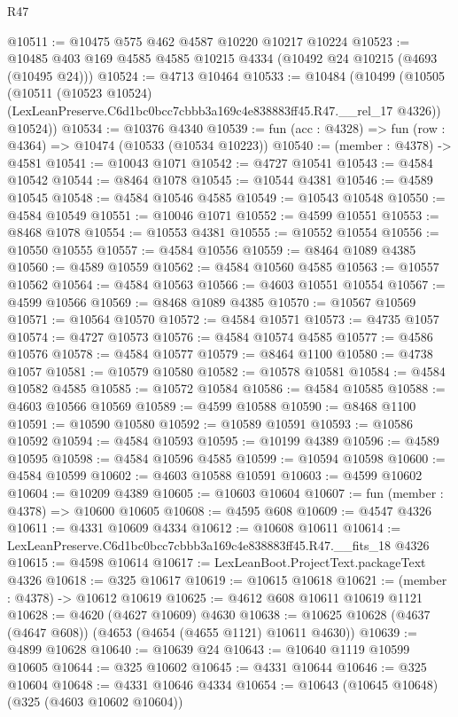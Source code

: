 \begin{lexlean}{R47}
\begin{coremodule}
@10511 := @10475 @575 @462 @4587 @10220 @10217 @10224
@10523 := @10485 @403 @169 @4585 @4585 @10215 @4334 (@10492 @24 @10215 (@4693 (@10495 @24)))
@10524 := @4713 @10464
@10533 := @10484
    (@10499
      (@10505
        (@10511
          (@10523 @10524)
          (LexLeanPreserve.C6d1bc0bcc7cbbb3a169c4e838883ff45.R47.__rel_17 @4326))
        @10524))
@10534 := @10376 @4340
@10539 := fun (acc : @4328) => fun (row : @4364) => @10474 (@10533 (@10534 @10223))
@10540 := (member : @4378) -> @4581
@10541 := @10043 @1071
@10542 := @4727 @10541
@10543 := @4584 @10542
@10544 := @8464 @1078
@10545 := @10544 @4381
@10546 := @4589 @10545
@10548 := @4584 @10546 @4585
@10549 := @10543 @10548
@10550 := @4584 @10549
@10551 := @10046 @1071
@10552 := @4599 @10551
@10553 := @8468 @1078
@10554 := @10553 @4381
@10555 := @10552 @10554
@10556 := @10550 @10555
@10557 := @4584 @10556
@10559 := @8464 @1089 @4385
@10560 := @4589 @10559
@10562 := @4584 @10560 @4585
@10563 := @10557 @10562
@10564 := @4584 @10563
@10566 := @4603 @10551 @10554
@10567 := @4599 @10566
@10569 := @8468 @1089 @4385
@10570 := @10567 @10569
@10571 := @10564 @10570
@10572 := @4584 @10571
@10573 := @4735 @1057
@10574 := @4727 @10573
@10576 := @4584 @10574 @4585
@10577 := @4586 @10576
@10578 := @4584 @10577
@10579 := @8464 @1100
@10580 := @4738 @1057
@10581 := @10579 @10580
@10582 := @10578 @10581
@10584 := @4584 @10582 @4585
@10585 := @10572 @10584
@10586 := @4584 @10585
@10588 := @4603 @10566 @10569
@10589 := @4599 @10588
@10590 := @8468 @1100
@10591 := @10590 @10580
@10592 := @10589 @10591
@10593 := @10586 @10592
@10594 := @4584 @10593
@10595 := @10199 @4389
@10596 := @4589 @10595
@10598 := @4584 @10596 @4585
@10599 := @10594 @10598
@10600 := @4584 @10599
@10602 := @4603 @10588 @10591
@10603 := @4599 @10602
@10604 := @10209 @4389
@10605 := @10603 @10604
@10607 := fun (member : @4378) => @10600 @10605
@10608 := @4595 @608
@10609 := @4547 @4326
@10611 := @4331 @10609 @4334
@10612 := @10608 @10611
@10614 := LexLeanPreserve.C6d1bc0bcc7cbbb3a169c4e838883ff45.R47.__fits_18 @4326
@10615 := @4598 @10614
@10617 := LexLeanBoot.ProjectText.packageText @4326
@10618 := @325 @10617
@10619 := @10615 @10618
@10621 := (member : @4378) -> @10612 @10619
@10625 := @4612 @608 @10611 @10619 @1121
@10628 := @4620 (@4627 @10609) @4630
@10638 := @10625 @10628 (@4637 (@4647 @608)) (@4653 (@4654 (@4655 @1121) @10611 @4630))
@10639 := @4899 @10628
@10640 := @10639 @24
@10643 := @10640 @1119 @10599 @10605
@10644 := @325 @10602
@10645 := @4331 @10644
@10646 := @325 @10604
@10648 := @4331 @10646 @4334
@10654 := @10643 (@10645 @10648) (@325 (@4603 @10602 @10604))

\end{coremodule}
\end{lexlean}
